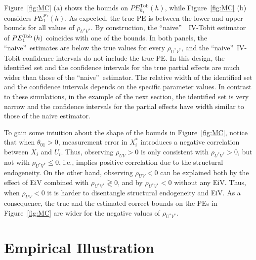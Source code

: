 \documentclass[12pt]{article}
\begin{document}
Figure~\ref{fig:MC} (a) shows the bounds on $PE_{h_{1}}^{\text{Tob}}\left(
h\right) $, while Figure~\ref{fig:MC} (b) considers $PE_{1}^{\text{Pr}%
}\left( h\right) $. As expected, the true PE is between the lower and upper
bounds for all values of $\rho _{U^{\ast }V^{\ast }}$. By construction, the
\textquotedblleft naive\textquotedblright\ \ IV-Tobit estimator of $PE_{1}^{%
\text{Tob}}\left( h\right) $ coincides with one of the bounds. In both
panels, the \textquotedblleft naive\textquotedblright\ estimates are below
the true values for every $\rho _{U^{\ast }V^{\ast }}$, and the
\textquotedblleft naive\textquotedblright\ IV-Tobit confidence intervals do
not include the true PE. In this design, the identified set and the
confidence intervals for the true partial effects are much wider than those
of the \textquotedblleft naive\textquotedblright\ estimator. The relative
width of the identified set and the confidence intervals depends on the
specific parameter values. In contrast to these simulations, in the example
of the next section, the identified set is very narrow and the confidence
intervals for the partial effects have width similar to those of the naive
estimator.

To gain some intuition about the shape of the bounds in Figure~\ref{fig:MC},
notice that when $\theta _{01}>0$, measurement error in $X_{i}^{\ast }$
introduces a negative correlation between $X_{i}$ and $U_{i}$. Thus,
observing $\rho _{UV}>0$ is only consistent with $\rho _{U^{\ast }V^{\ast
}}>0$, but not with $\rho _{U^{\ast }V^{\ast }}\leq 0$, i.e., implies
positive correlation due to the structural endogeneity. On the other hand,
observing $\rho _{UV}<0$ can be explained both by the effect of EiV combined
with $\rho _{U^{\ast }V^{\ast }}\gtrless 0$, and by $\rho _{U^{\ast }V^{\ast
}}<0$ without any EiV. Thus, when $\rho _{UV}<0$ it is harder to disentangle
structural endogeneity and EiV. As a consequence, the true and the estimated
correct bounds on the PEs in Figure~\ref{fig:MC} are wider for the negative
values of $\rho _{U^{\ast }V^{\ast }}$.

\bigskip

\section{Empirical Illustration\label{sec:Empirical}}
\end{document}
